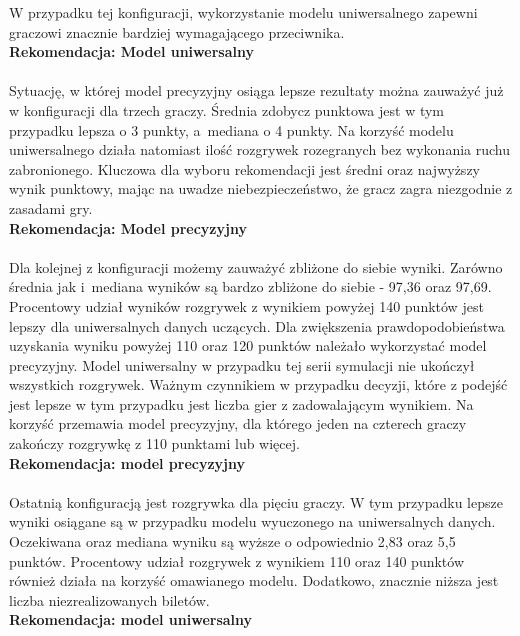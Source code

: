 \documentclass[12pt, oneside]{report}
\begin{document}
	W przypadku tej konfiguracji, wykorzystanie modelu uniwersalnego zapewni graczowi znacznie bardziej wymagającego przeciwnika.
	\\
	\textbf{Rekomendacja: Model uniwersalny} \\ \\ 
	Sytuację, w której model precyzyjny osiąga lepsze rezultaty można zauważyć już w konfiguracji dla trzech graczy. Średnia zdobycz punktowa jest w tym przypadku lepsza o 3 punkty, a~mediana o 4 punkty. Na korzyść modelu uniwersalnego działa natomiast ilość rozgrywek rozegranych bez wykonania ruchu zabronionego. Kluczowa dla wyboru rekomendacji jest średni oraz najwyższy wynik punktowy, mając na uwadze niebezpieczeństwo, że gracz zagra niezgodnie z zasadami gry.
	\\
	\textbf{Rekomendacja: Model precyzyjny} \\ \\
	Dla kolejnej z konfiguracji możemy zauważyć zbliżone do siebie wyniki. Zarówno średnia jak i~mediana wyników są bardzo zbliżone do siebie - 97,36 oraz 97,69. Procentowy udział wyników rozgrywek z wynikiem powyżej 140 punktów jest lepszy dla uniwersalnych danych uczących. Dla zwiększenia prawdopodobieństwa uzyskania wyniku powyżej 110 oraz 120 punktów należało wykorzystać model precyzyjny. Model uniwersalny w przypadku tej serii symulacji nie ukończył wszystkich rozgrywek. Ważnym czynnikiem w przypadku decyzji, które z podejść jest lepsze w tym przypadku jest liczba gier z zadowalającym wynikiem. Na korzyść przemawia model precyzyjny, dla którego jeden na czterech graczy zakończy rozgrywkę z 110 punktami lub więcej.
	\\ \textbf{Rekomendacja: model precyzyjny} \\ \\ 
	Ostatnią konfiguracją jest rozgrywka dla pięciu graczy. W tym przypadku lepsze wyniki osiągane są w przypadku modelu wyuczonego na uniwersalnych danych. Oczekiwana oraz mediana wyniku są wyższe o odpowiednio 2,83 oraz 5,5 punktów. Procentowy udział rozgrywek z wynikiem 110 oraz 140 punktów również działa na korzyść omawianego modelu. Dodatkowo, znacznie niższa jest liczba niezrealizowanych biletów. \\ \textbf{Rekomendacja: model uniwersalny} \\ \\
\end{document}
